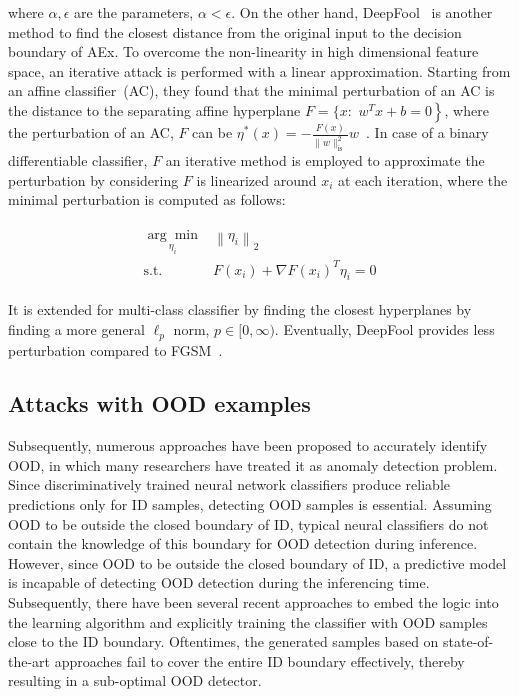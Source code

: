 \hspace*{3.5mm} where $\alpha, \epsilon$ are the parameters, $\alpha<\epsilon$. On the other hand, DeepFool~\cite{moosavi2016deepfool} is another method to find the closest distance from the original input to the decision boundary of AEx. To overcome the non-linearity in high dimensional feature space, an iterative attack is performed with a linear approximation. Starting from an affine classifier~(AC), they found that the minimal perturbation of an AC is the distance to the separating affine hyperplane ${F}=\{x:$ $\left.w^{T} x+b=0\right\}$, where the perturbation of an AC, $F$ can be $\eta^{*}(x)=-\frac{F(x)}{\|w\|_{\text {is }}^{2}} w$~\cite{yuan2019adversarial}. In case of a binary differentiable classifier, $F$ an iterative method is employed to approximate the perturbation by considering $F$ is linearized around $x_{i}$ at each iteration, where the minimal perturbation is computed as follows:
 
\vspace{-6mm}
\begin{align}
    \begin{array}{ll}
    \underset{\eta_{i}}{\arg \min } & \left\|\eta_{i}\right\|_{2} \\
    \text {s.t.} & F\left(x_{i}\right)+\nabla F\left(x_{i}\right)^{T} \eta_{i}=0
    \end{array}
\end{align}

\hspace*{3.5mm} It is extended for multi-class classifier by finding the closest hyperplanes by finding a more general $\ell_{p}$ norm, $p \in[0, \infty)$. Eventually, DeepFool provides less perturbation compared to FGSM~\cite{yuan2019adversarial}.

\subsection{Attacks with OOD examples}
Subsequently, numerous approaches have been proposed to accurately identify OOD, in which many researchers have treated it as anomaly detection problem. Since discriminatively trained neural network classifiers produce reliable predictions only for ID samples, detecting OOD samples is essential. Assuming OOD to be outside the closed boundary of ID, typical neural classifiers do not contain the knowledge of this boundary for OOD detection during inference.  However, since OOD to be outside the closed boundary of ID, a predictive model is incapable of detecting OOD detection during the inferencing time. Subsequently, there have been several recent approaches to embed the logic into the learning algorithm and explicitly training the classifier with OOD samples close to the ID boundary. Oftentimes, the generated samples based on state-of-the-art approaches fail to cover the entire ID boundary effectively, thereby resulting in a sub-optimal OOD detector. 

